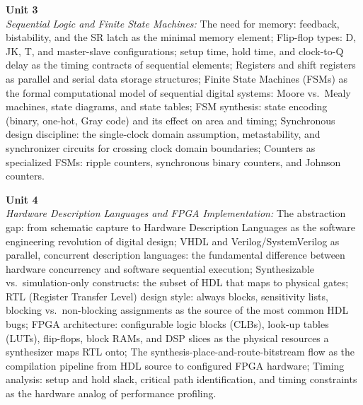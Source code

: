 \vspace{0.3cm}

\noindent\textbf{Unit 3} \\
\textit{Sequential Logic and Finite State Machines:} The need for memory: feedback, bistability, and the SR latch as the minimal memory element; Flip-flop types: D, JK, T, and master-slave configurations; setup time, hold time, and clock-to-Q delay as the timing contracts of sequential elements; Registers and shift registers as parallel and serial data storage structures; Finite State Machines (FSMs) as the formal computational model of sequential digital systems: Moore vs.\ Mealy machines, state diagrams, and state tables; FSM synthesis: state encoding (binary, one-hot, Gray code) and its effect on area and timing; Synchronous design discipline: the single-clock domain assumption, metastability, and synchronizer circuits for crossing clock domain boundaries; Counters as specialized FSMs: ripple counters, synchronous binary counters, and Johnson counters.

\vspace{0.3cm}

\noindent\textbf{Unit 4} \\
\textit{Hardware Description Languages and FPGA Implementation:} The abstraction gap: from schematic capture to Hardware Description Languages as the software engineering revolution of digital design; VHDL and Verilog/SystemVerilog as parallel, concurrent description languages: the fundamental difference between hardware concurrency and software sequential execution; Synthesizable vs.\ simulation-only constructs: the subset of HDL that maps to physical gates; RTL (Register Transfer Level) design style: always blocks, sensitivity lists, blocking vs.\ non-blocking assignments as the source of the most common HDL bugs; FPGA architecture: configurable logic blocks (CLBs), look-up tables (LUTs), flip-flops, block RAMs, and DSP slices as the physical resources a synthesizer maps RTL onto; The synthesis-place-and-route-bitstream flow as the compilation pipeline from HDL source to configured FPGA hardware; Timing analysis: setup and hold slack, critical path identification, and timing constraints as the hardware analog of performance profiling.

\vspace{0.3cm}

